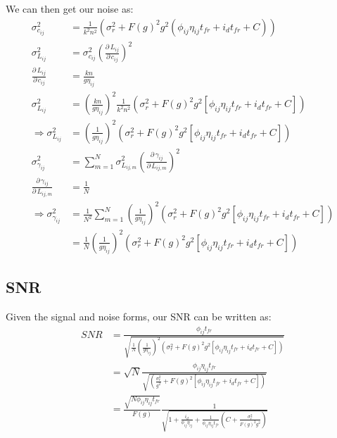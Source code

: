 \documentclass{article}
\newcommand{\dd}[2]{\frac{\partial\,#1}{\partial\,#2}}
\begin{document}
We can then get our noise as:
\begin{align}
\sigma_{c_{ij}}^2 &= \frac{1}{k^2 n^2} \left(\sigma_{r}^2 + F(g)^2 g^2 \left(\phi_{ij} \eta_{ij} t_{fr} + i_{d} t_{fr} + C\right)\right) \label{eq:noisec} \\
\sigma_{L_{ij}}^2 &= \sigma_{c_{ij}}^2 \left(\dd{L_{ij}}{c_{ij}}\right)^2 \nonumber \\
\dd{L_{ij}}{c_{ij}} &= \frac{k n}{g \eta_{ij}} \nonumber \\
\sigma_{L_{ij}}^2 &= \left(\frac{k n}{g \eta_{ij}}\right)^2 \frac{1}{k^2 n^2}\left(\sigma_{r}^2 + F(g)^2 g^2 \left[\phi_{ij} \eta_{ij} t_{fr} + i_{d} t_{fr} + C\right]\right) \nonumber\\
\Rightarrow \sigma_{L_{ij}}^2 &= \left(\frac{1}{g \eta_{ij}}\right)^2 \left(\sigma_{r}^2 + F(g)^2 g^2 \left[\phi_{ij} \eta_{ij} t_{fr} + i_{d} t_{fr} + C\right]\right) \\
\sigma_{\gamma_{ij}}^2 &= \sum_{m=1}^N \sigma_{L_{ij, m}}^2 \left(\dd{\gamma_{ij}}{L_{ij, m}} \right)^2 \\
\dd{\gamma_{ij}}{L_{ij, m}} &= \frac{1}{N} \nonumber\\
\Rightarrow \sigma_{\gamma_{ij}}^2 &= \frac{1}{N^2} \sum_{m=1}^N \left(\frac{1}{g \eta_{ij}}\right)^2 \left(\sigma_{r}^2 + F(g)^2 g^2 \left[\phi_{ij} \eta_{ij} t_{fr} + i_{d} t_{fr} + C\right]\right) \nonumber\\
&= \frac{1}{N} \left(\frac{1}{g \eta_{ij}}\right)^2 \left(\sigma_{r}^2 + F(g)^2 g^2 \left[\phi_{ij} \eta_{ij} t_{fr} + i_{d} t_{fr} + C\right]\right)
\end{align}

\subsection{SNR}

Given the signal and noise forms, our SNR can be written as:
\begin{align}
SNR &= \frac{\phi_{ij} t_{fr}}{\sqrt{\frac{1}{N} \left(\frac{1}{g \eta_{ij}}\right)^2 \left(\sigma_{r}^2 + F(g)^2 g^2 \left[\phi_{ij} \eta_{ij} t_{fr} + i_{d} t_{fr} + C\right]\right)}} \nonumber \\
&= \sqrt{N} \frac{\phi_{ij} \eta_{ij} t_{fr}}{\sqrt{\left(\frac{\sigma_{r}^2}{g^2} + F(g)^2  \left[\phi_{ij} \eta_{ij} t_{fr} + i_{d} t_{fr} + C\right]\right)}} \\
 &= \frac{\sqrt{N \phi_{ij} \eta_{ij} t_{fr}}}{F(g)} \frac{1}{\sqrt{1 + \frac{i_{d}}{\phi_{ij} \eta_{ij}} + \frac{1}{\phi_{ij} \eta_{ij} t_{fr}}\left(C + \frac{\sigma_{r}^2}{F(g)^2 g^2}\right) }}
\end{align}
\end{document}
